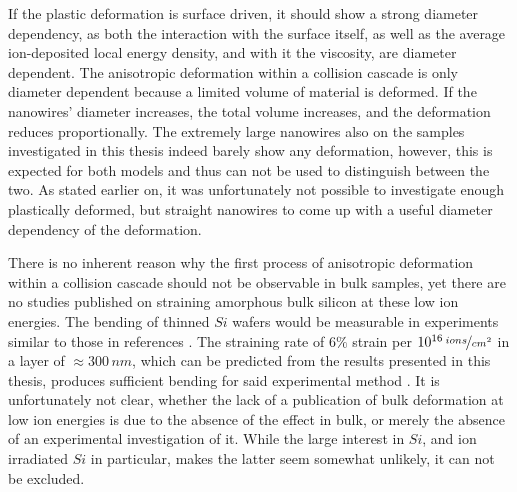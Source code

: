 If the plastic deformation is surface driven, it should show a strong diameter dependency, as both the interaction with the surface itself, as well as the average ion-deposited local energy density, and with it the viscosity, are diameter dependent. The anisotropic deformation within a collision cascade is only diameter dependent because a limited volume of material is deformed. If the nanowires' diameter increases, the total volume increases, and the deformation reduces proportionally. The extremely large nanowires also on the samples investigated in this thesis indeed barely show any deformation, however, this is expected for both models and thus can not be used to distinguish between the two. As stated earlier on, it was unfortunately not possible to investigate enough plastically deformed, but straight nanowires to come up with a useful diameter dependency of the deformation.

There is no inherent reason why the first process of anisotropic deformation within a collision cascade should not be observable in bulk samples, yet there are no studies published on straining amorphous bulk silicon at these low ion energies. The bending of thinned $Si$ wafers would be measurable in experiments similar to those in references \cite{volkert_stress_1991,massl_stress_2008}. The straining rate of $6\%$ strain per $10^{16}\,\nicefrac{ions}{cm^2}$ in a layer of $\approx 300\,nm$, which can be predicted from the results presented in this thesis, produces sufficient bending for said experimental method \cite{flinn_measurement_1987}. It is unfortunately not clear, whether the lack of a publication of bulk deformation at low ion energies is due to the absence of the effect in bulk, or merely the absence of an experimental investigation of it. While the large interest in $Si$, and ion irradiated $Si$ in particular, makes the latter seem somewhat unlikely, it can not be excluded.

